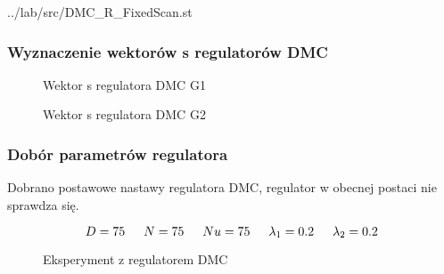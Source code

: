 \lstset{style=customc}
\ifdefined\CompileListings
    
        {../lab/src/DMC_R_FixedScan.st}
    \newpage
\fi

\subsubsection{Wyznaczenie wektorów s regulatorów DMC}


\ifdefined\CompileFigures
\begin{figure}[H] 
    \centering
    
    \caption{Wektor s regulatora DMC  G1}
    \label{lab:zad4:figure:wektorS1}
 \end{figure}
\fi

\ifdefined\CompileFigures
\begin{figure}[H] 
    \centering
    
    \caption{Wektor s regulatora DMC G2}
    \label{lab:zad4:figure:wektorS2}
 \end{figure}
\fi


\subsubsection{Dobór parametrów regulatora}

Dobrano postawowe nastawy regulatora DMC, regulator w obecnej postaci nie sprawdza się.

$$D = \num{75} \indent N = \num{75} \indent Nu = \num{75} \indent \lambda_{1} = \num{0.2} \indent \lambda_{2} = \num{0.2}$$
\ifdefined\CompileFigures
\begin{figure}[H] 
    \centering
    
    \caption{Eksperyment z regulatorem DMC}
    \label{lab:zad4:figure:wektorS2}
 \end{figure}
\fi

\newpage

